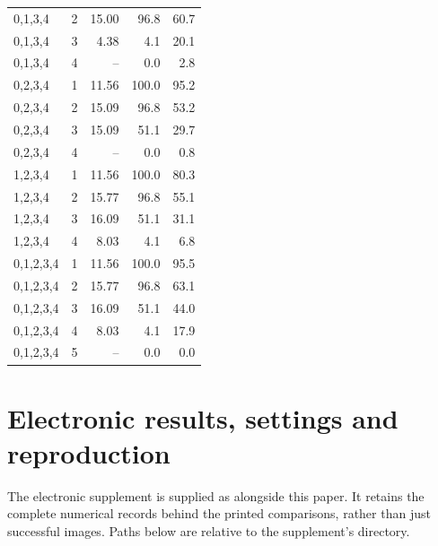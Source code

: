 \documentclass[11pt]{article}
\begin{document}
\begin{longtable}{@{}lrrrr@{}}
0,1,3,4 & 2 & 15.00 & 96.8 & 60.7\\
0,1,3,4 & 3 & 4.38 & 4.1 & 20.1\\
0,1,3,4 & 4 & -- & 0.0 & 2.8\\
0,2,3,4 & 1 & 11.56 & 100.0 & 95.2\\
0,2,3,4 & 2 & 15.09 & 96.8 & 53.2\\
0,2,3,4 & 3 & 15.09 & 51.1 & 29.7\\
0,2,3,4 & 4 & -- & 0.0 & 0.8\\
1,2,3,4 & 1 & 11.56 & 100.0 & 80.3\\
1,2,3,4 & 2 & 15.77 & 96.8 & 55.1\\
1,2,3,4 & 3 & 16.09 & 51.1 & 31.1\\
1,2,3,4 & 4 & 8.03 & 4.1 & 6.8\\
0,1,2,3,4 & 1 & 11.56 & 100.0 & 95.5\\
0,1,2,3,4 & 2 & 15.77 & 96.8 & 63.1\\
0,1,2,3,4 & 3 & 16.09 & 51.1 & 44.0\\
0,1,2,3,4 & 4 & 8.03 & 4.1 & 17.9\\
0,1,2,3,4 & 5 & -- & 0.0 & 0.0\\
\bottomrule\end{longtable}\endgroup


\section{Electronic results, settings and reproduction}
\label{saft:reproduction}
The electronic supplement is supplied as  alongside this paper. It retains the complete numerical records behind the printed comparisons, rather than just successful images. Paths below are relative to the supplement's  directory.
\end{document}
